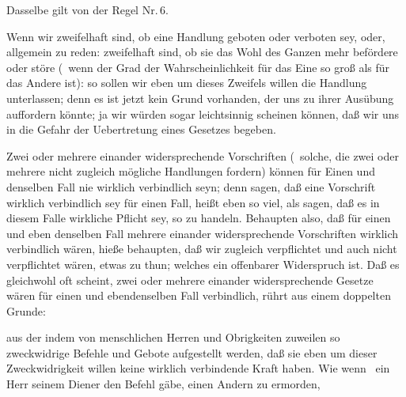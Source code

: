\begin{aufza}
\item Dasselbe gilt von der Regel Nr.\,6.
\item Wenn wir zweifelhaft sind, ob eine Handlung geboten oder verboten sey, oder, allgemein zu reden: zweifelhaft sind, ob sie das Wohl des Ganzen mehr befördere oder störe (\dh\  wenn der Grad der Wahrscheinlichkeit für das Eine so groß als für das Andere ist): so sollen wir eben um dieses Zweifels willen die Handlung unterlassen; denn es ist jetzt kein Grund vorhanden, der uns zu ihrer Ausübung auffordern könnte; ja wir würden sogar leichtsinnig scheinen können, daß wir uns in die Gefahr der Uebertretung eines Gesetzes begeben.~
\item Zwei oder mehrere einander widersprechende Vorschriften (\dh\  solche, die zwei oder mehrere nicht zugleich mögliche Handlungen fordern) können für Einen und denselben Fall nie wirklich verbindlich seyn; denn sagen, daß eine Vorschrift wirklich verbindlich sey für einen Fall, heißt eben so viel, als sagen, daß es in diesem Falle wirkliche Pflicht sey, so zu handeln. Behaupten also, daß für einen und eben denselben Fall mehrere einander widersprechende Vorschriften wirklich verbindlich wären, hieße behaupten, daß wir zugleich verpflichtet und auch nicht verpflichtet wären, etwas zu thun; welches ein offenbarer Widerspruch ist. Daß es gleichwohl oft scheint, zwei oder mehrere einander widersprechende Gesetze wären für einen und ebendenselben Fall verbindlich, rührt aus einem doppelten Grunde:
\begin{aufzb}
\item aus der  indem von menschlichen Herren und Obrigkeiten zuweilen so zweckwidrige Befehle und Gebote aufgestellt werden, daß sie eben um dieser Zweckwidrigkeit willen keine wirklich verbindende Kraft haben. Wie wenn \zB\ ein Herr seinem Diener den Befehl gäbe, einen Andern zu ermorden, \udgl\ 

\end{aufzb}
\end{aufza}
